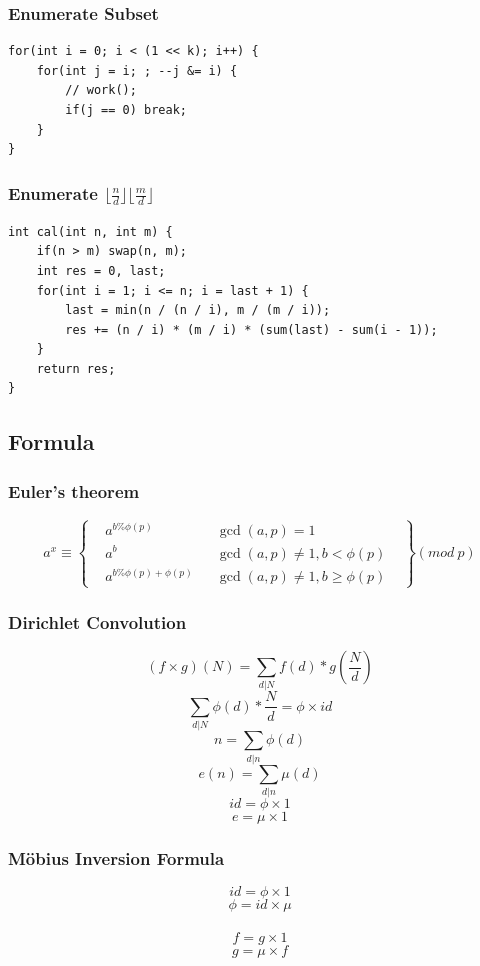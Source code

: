 \documentclass[10pt]{ctexart}
\begin{document}
{\subsubsection{Enumerate Subset}
\begin{lstlisting}
for(int i = 0; i < (1 << k); i++) {
    for(int j = i; ; --j &= i) {
        // work();
        if(j == 0) break;
    }
}
\end{lstlisting}
\subsubsection{Enumerate $\lfloor\frac{n}{d}\rfloor\lfloor\frac{m}{d}\rfloor$}
\begin{lstlisting}
int cal(int n, int m) {
    if(n > m) swap(n, m);
    int res = 0, last;
    for(int i = 1; i <= n; i = last + 1) {
        last = min(n / (n / i), m / (m / i));
        res += (n / i) * (m / i) * (sum(last) - sum(i - 1));
    }
    return res;
}
\end{lstlisting}
\subsection{Formula}
\subsubsection{Euler's theorem}
$$
a^x\equiv\left\{
\begin{aligned}
&a^{b\%\phi(p)} & & \gcd(a,p)=1&\\
&a^b & &\gcd(a,p)\not=1,b<\phi(p) \\
&a^{b\%\phi(p) + \phi(p)} & & \gcd(a,p)\not=1,b\geq \phi(p) &
\end{aligned}
\right\}
(mod\ p)
$$
\subsubsection{Dirichlet Convolution}
$$
(f\times g)(N)=\sum_{d|N} f(d) * g(\frac{N}{d})
$$
$$
\sum_{d|N} \phi(d) * \frac{N}{d} = \phi \times id
$$
$$
n = \sum_{d|n} \phi(d)
$$
$$
e(n)=\sum_{d|n} \mu(d)
$$
$$
id=\phi \times 1
$$
$$
e=\mu \times 1
$$
\subsubsection{Möbius Inversion Formula}
$$
id=\phi \times 1
$$
$$
\phi = id \times \mu
$$
\\
$$
f=g \times 1
$$
$$
g=\mu \times f
$$
}
\end{document}
